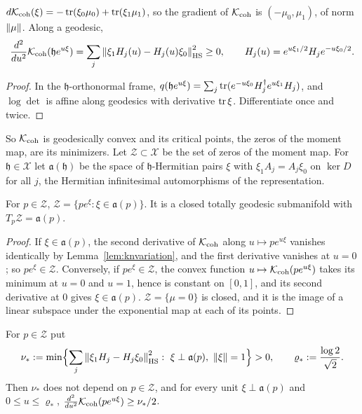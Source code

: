 \begin{lemma}\label{lem:knvariation}
$d\mathcal K_{\mathrm{coh}}(\xi)=-\operatorname{tr}(\xi_0\mu_0)+\operatorname{tr}(\xi_1\mu_1)$, so the gradient of
$\mathcal K_{\mathrm{coh}}$ is $(-\mu_0,\mu_1)$, of norm $\left\lVert\mu\right\rVert$. Along a geodesic,
\[
 \frac{d^2}{du^2}\mathcal K_{\mathrm{coh}}(\mathfrak he^{u\xi})
 =\sum_j\left\lVert\xi_1H_j(u)-H_j(u)\xi_0\right\rVert_{\mathrm{HS}}^2\geq0,\qquad
 H_j(u)=e^{u\xi_1/2}H_je^{-u\xi_0/2}.
\]
\end{lemma}

\begin{proof}
In the $\mathfrak h$-orthonormal frame,
$q(\mathfrak he^{u\xi})=\sum_j\operatorname{tr}(e^{-u\xi_0}H_j^\dagger e^{u\xi_1}H_j)$, and
$\log\det$ is affine along geodesics with derivative $\operatorname{tr}\xi$. Differentiate
once and twice.
\end{proof}

So $\mathcal K_{\mathrm{coh}}$ is geodesically convex and its critical points, the zeros of
the moment map, are its minimizers. Let $\mathcal Z\subset\mathcal X$ be the
set of zeros of the moment map. For $\mathfrak h\in\mathcal X$ let $\mathfrak a(\mathfrak h)$ be
the space of $\mathfrak h$-Hermitian pairs $\xi$ with $\xi_1A_j=A_j\xi_0$ on $\ker D$
for all $j$, the Hermitian infinitesimal automorphisms of the
representation.

\begin{lemma}\label{lem:minimumset}
For $p\in\mathcal Z$, $\mathcal Z=\{pe^\xi:\xi\in\mathfrak a(p)\}$. It is a
closed totally geodesic submanifold with $T_p\mathcal Z=\mathfrak a(p)$.
\end{lemma}

\begin{proof}
If $\xi\in\mathfrak a(p)$, the second derivative of $\mathcal K_{\mathrm{coh}}$ along
$u\mapsto pe^{u\xi}$ vanishes identically by Lemma~\ref{lem:knvariation}, and
the first derivative vanishes at $u=0$; so $pe^\xi\in\mathcal Z$. Conversely,
if $pe^\xi\in\mathcal Z$, the convex function
$u\mapsto\mathcal K_{\mathrm{coh}}(pe^{u\xi})$ takes its minimum at $u=0$ and $u=1$, hence is
constant on $[0,1]$, and its second derivative at $0$ gives
$\xi\in\mathfrak a(p)$. $\mathcal Z=\{\mu=0\}$ is closed, and it is the image
of a linear subspace under the exponential map at each of its points.
\end{proof}

\begin{lemma}\label{lem:gap}
For $p\in\mathcal Z$ put
\[
 \nu_*:=\min\Bigl\{\sum_j\norm{\xi_1H_j-H_j\xi_0}_{\HS}^2:\
 \xi\perp\mathfrak a(p),\ \norm\xi=1\Bigr\}>0,\qquad\varrho_*:=\frac{\log2}{\sqrt2}.
\]
Then $\nu_*$ does not depend on $p\in\mathcal Z$, and for every unit
$\xi\perp\mathfrak a(p)$ and $0\leq u\leq\varrho_*$,
$\frac{d^2}{du^2}\mathcal K_{\mathrm{coh}}(pe^{u\xi})\geq\nu_*/2$.
\end{lemma}

